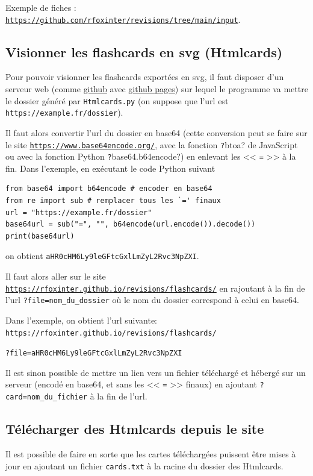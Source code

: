 \documentclass[a4paper,12pt]{article}
\begin{document}
Exemple de fiches : \href{https://github.com/rfoxinter/revisions/tree/main/input}{\texttt{https://github.com/rfoxinter/revisions/tree/main/input}}.
\subsection{Visionner les flashcards en svg (Htmlcards)}
Pour pouvoir visionner les flashcards exportées en svg, il faut disposer d'un serveur web (comme \href{https://github.com/}{github} avec \href{https://pages.github.com/}{github pages}) sur lequel le programme va mettre le dossier généré par \texttt{Htmlcards.py} (on suppose que l'url est \texttt{https://example.fr/dossier}).

Il faut alors convertir l'url du dossier en base64 (cette conversion peut se faire sur le site \href{https://www.base64encode.org/}{\texttt{https://www.base64encode.org/}}, avec la fonction \texttt?btoa? de JavaScript ou avec la  fonction Python \texttt?base64.b64encode?) en enlevant les << \texttt{=} >> à la fin. Dans l'exemple, en exécutant le code Python suivant
\vspace{-\abovedisplayskip}\begin{verbatim}
from base64 import b64encode # encoder en base64
from re import sub # remplacer tous les `=' finaux
url = "https://example.fr/dossier"
base64url = sub("=", "", b64encode(url.encode()).decode())
print(base64url)
\end{verbatim}
\vspace{-\belowdisplayskip}

on obtient \texttt{aHR0cHM6Ly9leGFtcGxlLmZyL2Rvc3NpZXI}.

Il faut alors aller sur le site \href{https://rfoxinter.github.io/revisions/flashcards/}{\texttt{https://rfoxinter.github.io/revisions/flashcards/}} en rajoutant à la fin de l'url \texttt{?file=nom\_du\_dossier} où le nom du dossier correspond à celui en base64.

Dans l'exemple, on obtient l'url suivante:\\\texttt{https://rfoxinter.github.io/revisions/flashcards/}

\hfill\texttt{?file=aHR0cHM6Ly9leGFtcGxlLmZyL2Rvc3NpZXI}

Il est sinon possible de mettre un lien vers un fichier téléchargé et hébergé sur un serveur (encodé en base64, et sans les << \texttt{=} >> finaux) en ajoutant \texttt{?card=nom\_du\_fichier} à la fin de l'url.
\subsection{Télécharger des Htmlcards depuis le site}
Il est possible de faire en sorte que les cartes téléchargées puissent être mises à jour en ajoutant un fichier \texttt{cards.txt} à la racine du dossier des Htmlcards.
\end{document}
